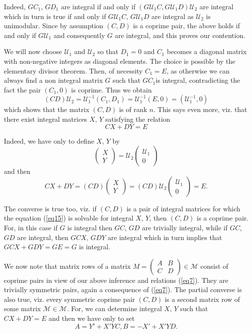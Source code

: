 Indeed, $GC_1$, $GD_1$ are integral if and only if $(G  \mathscr{U}_1 C, G
\mathscr{U}_1   D) \mathscr{U}_2$ are integral which in turn is true
if and only if $G \mathscr{U}_1   C$, $G   \mathscr{U}_1   D$ are
integral as 
$\mathscr{U}_2$ is unimodular. Since by assumption $(C, D)$ is a
coprime pair, 
the above holds if and only if $G  \mathscr{U}_1$ and consequently $G$ are
integral, and this proves our 
contention. 

We will now choose $\mathscr{U}_1$ and $\mathscr{U}_2$ so that $D_1 =
0$ and $C_1$ becomes 
a diagonal matrix with non-negative integers as diagonal elements. The
choice is possible by the elementary divisor theorem. Then, of
necessity $C_1 = E$, as otherwise we can always find a non integral
matrix $G$ such that $GC_1$\pageoriginale  is integral, contradicting
the fact the 
pair $(C_1, 0)$ is coprime. Thus we obtain 
$$
(C   D) \mathscr{U}_2 = \mathscr{U}^{-1}_1 (C_1 , D_1) =
\mathscr{U}^{-1}_1 (E,0) = (\mathscr{U}^{-1}_1,0) 
$$
which shows that the matrix $(C, D)$ is of rank $n$. This says even
more, viz. that there exist integral matrices $X$, $Y$ satisfying the
relation  
\begin{equation*}
CX + DY = E \tag{15}\label{eq15}
\end{equation*}

Indeed, we have only to define $X$, $Y$ by 
$$
\begin{pmatrix} X \\ Y \end{pmatrix} = \mathscr{U}_2 \begin{pmatrix}
  \mathscr{U}_1 
  \\ 0 \end{pmatrix} 
$$
and then 
$$
CX + DY = (C   D) \begin{pmatrix} X \\ Y \end{pmatrix} = (C   D) 
\mathscr{U}_2 \begin{pmatrix} \mathscr{U}_1 \\ 0  \end{pmatrix} = E. 
$$

The converse is true too, viz. if $(C, D)$ is a pair of integral
matrices for which the equation (\ref{eq15}) is solvable for integral
$X$, $Y$, then 
$(C, D)$ is a coprime pair. For, in this case if $G$ is integral then
$GC$, $GD$ are trivially integral, while if $GC$, $GD$ are integral, then
$GCX$, $GDY$ are integral which in turn implies that $GCX + GDY = GE =
G$ is integral. 

We now note that matrix rows of a matrix $M = \begin{pmatrix} A & B
  \\ C & D\end{pmatrix} \in \mathcal{M}$ consist of coprime pairs in view of our
  above inference and relations (\ref{eq7}). They are trivially symmetric
  pairs, again a consequence of (\ref{eq7}). The partial converse is also
  true, viz. every symmetric coprime pair $(C, D)$ is a second matrix
  row of some matrix $\mathcal{M} \in \mathcal{M}$. For, we can determine
  integral $X$, $Y$ such that $C   X + D   Y = E$ and then we have
  only to set  
$$
A = Y' + X'YC, B = - X' + X' Y   D.
$$

